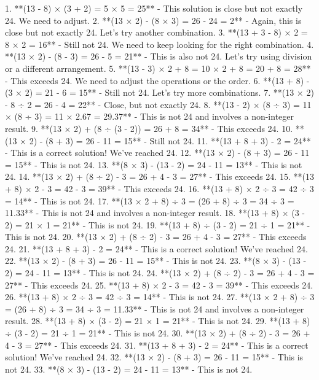 \begin{dialogue}
\begin{small}
\begin{spverbatim}
1. **(13 - 8) × (3 + 2) = 5 × 5 = 25**
   - This solution is close but not exactly 24. We need to adjust.
2. **(13 × 2) - (8 × 3) = 26 - 24 = 2**
   - Again, this is close but not exactly 24. Let's try another combination.
3. **(13 + 3 - 8) × 2 = 8 × 2 = 16**
   - Still not 24. We need to keep looking for the right combination.
4. **(13 × 2) - (8 - 3) = 26 - 5 = 21**
   - This is also not 24. Let's try using division or a different arrangement.
5. **(13 - 3) × 2 + 8 = 10 × 2 + 8 = 20 + 8 = 28**
   - This exceeds 24. We need to adjust the operations or the order.
6. **(13 + 8) - (3 × 2) = 21 - 6 = 15**
   - Still not 24. Let's try more combinations.
7. **(13 × 2) - 8 ÷ 2 = 26 - 4 = 22**
   - Close, but not exactly 24.
8. **(13 - 2) × (8 ÷ 3) = 11 × (8 ÷ 3) = 11 × 2.67 = 29.37**
   - This is not 24 and involves a non-integer result.
9. **(13 × 2) + (8 ÷ (3 - 2)) = 26 + 8 = 34**
   - This exceeds 24.
10. **(13 × 2) - (8 + 3) = 26 - 11 = 15**
    - Still not 24.
11. **(13 + 8 + 3) - 2 = 24**
    - This is a correct solution! We've reached 24.
12. **(13 × 2) - (8 + 3) = 26 - 11 = 15**
    - This is not 24.
13. **(8 × 3) - (13 - 2) = 24 - 11 = 13**
    - This is not 24.
14. **(13 × 2) + (8 ÷ 2) - 3 = 26 + 4 - 3 = 27**
    - This exceeds 24.
15. **(13 + 8) × 2 - 3 = 42 - 3 = 39**
    - This exceeds 24.
16. **(13 + 8) × 2 ÷ 3 = 42 ÷ 3 = 14**
    - This is not 24.
17. **(13 × 2 + 8) ÷ 3 = (26 + 8) ÷ 3 = 34 ÷ 3 = 11.33**
    - This is not 24 and involves a non-integer result.
18. **(13 + 8) × (3 - 2) = 21 × 1 = 21**
    - This is not 24.
19. **(13 + 8) ÷ (3 - 2) = 21 ÷ 1 = 21**
    - This is not 24.
20. **(13 × 2) + (8 ÷ 2) - 3 = 26 + 4 - 3 = 27**
    - This exceeds 24.
21. **(13 + 8 + 3) - 2 = 24**
    - This is a correct solution! We've reached 24.
22. **(13 × 2) - (8 + 3) = 26 - 11 = 15**
    - This is not 24.
23. **(8 × 3) - (13 - 2) = 24 - 11 = 13**
    - This is not 24.
24. **(13 × 2) + (8 ÷ 2) - 3 = 26 + 4 - 3 = 27**
    - This exceeds 24.
25. **(13 + 8) × 2 - 3 = 42 - 3 = 39**
    - This exceeds 24.
26. **(13 + 8) × 2 ÷ 3 = 42 ÷ 3 = 14**
    - This is not 24.
27. **(13 × 2 + 8) ÷ 3 = (26 + 8) ÷ 3 = 34 ÷ 3 = 11.33**
    - This is not 24 and involves a non-integer result.
28. **(13 + 8) × (3 - 2) = 21 × 1 = 21**
    - This is not 24.
29. **(13 + 8) ÷ (3 - 2) = 21 ÷ 1 = 21**
    - This is not 24.
30. **(13 × 2) + (8 ÷ 2) - 3 = 26 + 4 - 3 = 27**
    - This exceeds 24.
31. **(13 + 8 + 3) - 2 = 24**
    - This is a correct solution! We've reached 24.
32. **(13 × 2) - (8 + 3) = 26 - 11 = 15**
    - This is not 24.
33. **(8 × 3) - (13 - 2) = 24 - 11 = 13**
    - This is not 24.

\end{spverbatim}
\end{small}
\end{dialogue}
